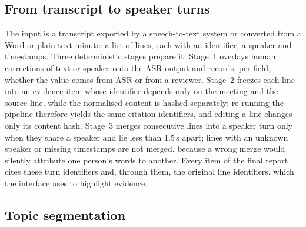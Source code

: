 \subsection{From transcript to speaker turns}
\label{sec:system:preprocess}

The input is a transcript exported by a speech-to-text system or converted from a Word or plain-text minute: a list of lines, each with an identifier, a speaker and timestamps.
Three deterministic stages prepare it.
Stage~1 overlays human corrections of text or speaker onto the ASR output and records, per field, whether the value comes from ASR or from a reviewer.
Stage~2 freezes each line into an evidence item whose identifier depends only on the meeting and the source line, while the normalised content is hashed separately; re-running the pipeline therefore yields the same citation identifiers, and editing a line changes only its content hash.
Stage~3 merges consecutive lines into a speaker turn only when they share a speaker and lie less than 1.5\,s apart; lines with an unknown speaker or missing timestamps are not merged, because a wrong merge would silently attribute one person's words to another.
Every item of the final report cites these turn identifiers and, through them, the original line identifiers, which the interface uses to highlight evidence.

\subsection{Topic segmentation}
\label{sec:system:segmentation}


